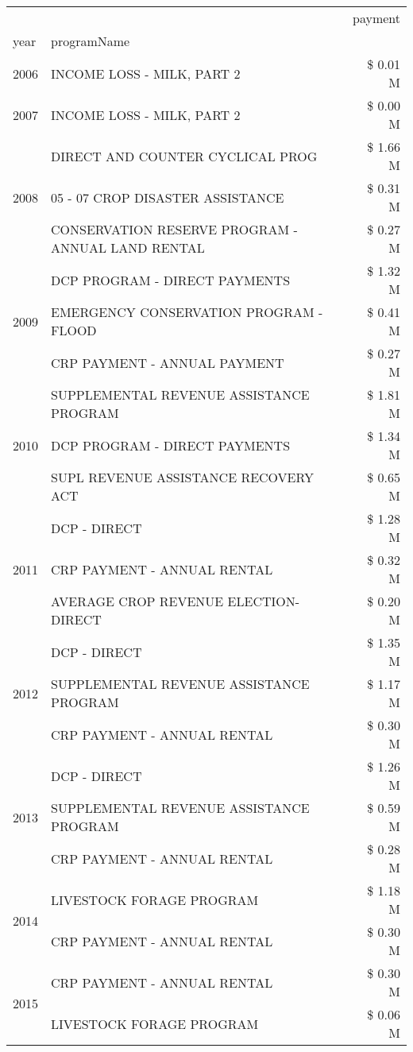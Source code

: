\begin{tabular}{llr}
\toprule
 &  & payment \\
year & programName &  \\
\midrule
2006 & INCOME LOSS - MILK, PART 2 & \$ 0.01 M \\
\cline{1-3}
2007 & INCOME LOSS - MILK, PART 2 & \$ 0.00 M \\
\cline{1-3}
\multirow[t]{3}{*}{2008} & DIRECT AND COUNTER CYCLICAL PROG & \$ 1.66 M \\
 & 05 - 07 CROP DISASTER ASSISTANCE & \$ 0.31 M \\
 & CONSERVATION RESERVE PROGRAM - ANNUAL LAND RENTAL & \$ 0.27 M \\
\cline{1-3}
\multirow[t]{3}{*}{2009} & DCP PROGRAM - DIRECT PAYMENTS & \$ 1.32 M \\
 & EMERGENCY CONSERVATION PROGRAM - FLOOD & \$ 0.41 M \\
 & CRP PAYMENT - ANNUAL PAYMENT & \$ 0.27 M \\
\cline{1-3}
\multirow[t]{3}{*}{2010} & SUPPLEMENTAL REVENUE ASSISTANCE PROGRAM & \$ 1.81 M \\
 & DCP PROGRAM - DIRECT PAYMENTS & \$ 1.34 M \\
 & SUPL REVENUE ASSISTANCE RECOVERY ACT & \$ 0.65 M \\
\cline{1-3}
\multirow[t]{3}{*}{2011} & DCP - DIRECT & \$ 1.28 M \\
 & CRP PAYMENT - ANNUAL RENTAL & \$ 0.32 M \\
 & AVERAGE CROP REVENUE ELECTION-DIRECT & \$ 0.20 M \\
\cline{1-3}
\multirow[t]{3}{*}{2012} & DCP - DIRECT & \$ 1.35 M \\
 & SUPPLEMENTAL REVENUE ASSISTANCE PROGRAM & \$ 1.17 M \\
 & CRP PAYMENT - ANNUAL RENTAL & \$ 0.30 M \\
\cline{1-3}
\multirow[t]{3}{*}{2013} & DCP - DIRECT & \$ 1.26 M \\
 & SUPPLEMENTAL REVENUE ASSISTANCE PROGRAM & \$ 0.59 M \\
 & CRP PAYMENT - ANNUAL RENTAL & \$ 0.28 M \\
\cline{1-3}
\multirow[t]{2}{*}{2014} & LIVESTOCK FORAGE PROGRAM & \$ 1.18 M \\
 & CRP PAYMENT - ANNUAL RENTAL & \$ 0.30 M \\
\cline{1-3}
\multirow[t]{3}{*}{2015} & CRP PAYMENT - ANNUAL RENTAL & \$ 0.30 M \\
 & LIVESTOCK FORAGE PROGRAM & \$ 0.06 M \\

\end{tabular}
